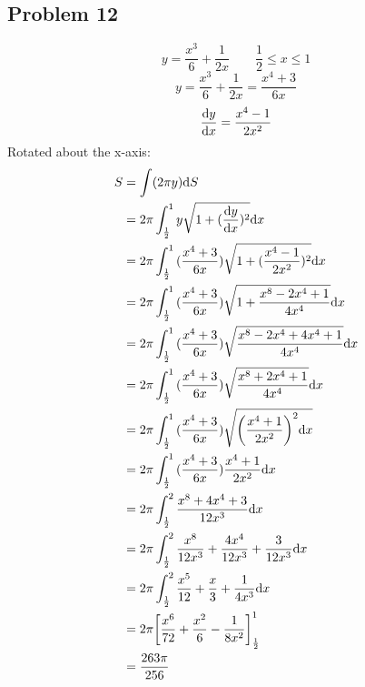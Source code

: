 \documentclass[letterpaper, 12pt]{math}
\begin{document}
\subsection*{Problem 12}
\[ y = \frac{x^{3}}{6}+\frac{1}{2x} \quad \quad \frac{1}{2} \leq x \leq 1 \]
\[ y = \frac{x^{3}}{6}+\frac{1}{2x} = \frac{x^{4}+3}{6x} \]
\[ \frac{\mathrm{d}{y}}{\mathrm{d}{x}} = \frac{x^{4}-1}{2x^{2}} \]
Rotated about the x-axis:
\begin{align*}
  S &= \int(2\pi y)\mathrm{d}{S} \\
  &= 2\pi\int_{\frac{1}{2}}^{1}{
    y\sqrt{1+(\frac{\mathrm{d}{y}}{\mathrm{d}{x}})^{2}}\mathrm{d}{x}} \\
  &= 2\pi\int_{\frac{1}{2}}^{1}{(\frac{x^{4}+3}{6x})
    \sqrt{1+(\frac{x^{4}-1}{2x^{2}})^{2}}\mathrm{d}{x}} \\
  &= 2\pi\int_{\frac{1}{2}}^{1}{(\frac{x^{4}+3}{6x})
    \sqrt{1+\frac{x^{8}-2x^{4}+1}{4x^{4}}}\mathrm{d}{x}} \\
  &= 2\pi\int_{\frac{1}{2}}^{1}{(\frac{x^{4}+3}{6x})
    \sqrt{\frac{x^{8}-2x^{4}+4x^{4}+1}{4x^{4}}}\mathrm{d}{x}} \\
  &= 2\pi\int_{\frac{1}{2}}^{1}{(\frac{x^{4}+3}{6x})
    \sqrt{\frac{x^{8}+2x^{4}+1}{4x^{4}}}\mathrm{d}{x}} \\
  &= 2\pi\int_{\frac{1}{2}}^{1}{(\frac{x^{4}+3}{6x})
    \sqrt{\bigg(\frac{x^{4}+1}{2x^{2}}\bigg)^{2}\mathrm{d}{x}}} \\
  &= 2\pi\int_{\frac{1}{2}}^{1}{(\frac{x^{4}+3}{6x})
    \frac{x^{4}+1}{2x^{2}}\mathrm{d}{x}} \\
  &= 2\pi\int_{\frac{1}{2}}^{2}{\frac{x^{8}+4x^{4}+3}{12x^{3}}\mathrm{d}{x}} \\
  &= 2\pi\int_{\frac{1}{2}}^{2}{
    \frac{x^{8}}{12x^{3}}+\frac{4x^{4}}{12x^{3}}+\frac{3}{12x^{3}}\mathrm{d}{x}} \\
  &= 2\pi\int_{\frac{1}{2}}^{2}{
    \frac{x^{5}}{12}+\frac{x}{3}+\frac{1}{4x^{3}}\mathrm{d}{x}} \\
  &= 2\pi\bigg[\frac{x^{6}}{72}+\frac{x^{2}}{6}-\frac{1}{8x^{2}}\bigg]
    _{\frac{1}{2}}^{1} \\
  &= \frac{263\pi}{256}
\end{align*}
\end{document}
